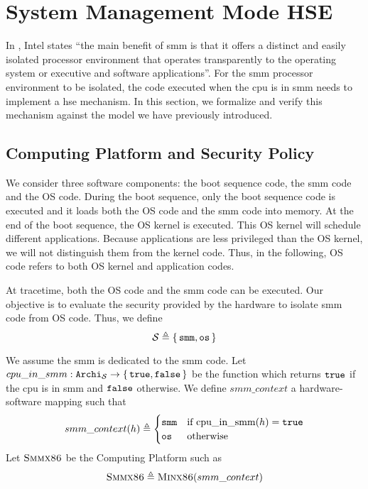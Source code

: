 \section{System Management Mode HSE}
\label{sec:speccert:smm}

In \cite{intel2014manual}, Intel states ``the main benefit of \ac{smm} is that
it offers a distinct and easily isolated processor environment that operates
transparently to the operating system or executive and software applications''.
%
For the \ac{smm} processor environment to be isolated, the code executed when
the \ac{cpu} is in \ac{smm} needs to implement a \ac{hse} mechanism.
%
In this section, we formalize and verify this mechanism against the model we
have previously introduced.

\subsection{Computing Platform and Security Policy}

We consider three software components: the boot sequence code, the \ac{smm} code
and the OS code.
%
During the boot sequence, only the boot sequence code is executed and it loads
both the OS code and the \ac{smm} code into memory.
%
At the end of the boot sequence, the OS kernel is executed.
%
This OS kernel will schedule different applications.
%
Because applications are less privileged than the OS kernel, we will not
distinguish them from the kernel code.
%
Thus, in the following, OS code refers to both OS kernel and application codes.

At tracetime, both the OS code and the \ac{smm} code can be executed.
%
Our objective is to evaluate the security provided by the hardware to isolate
\ac{smm} code from OS code.
%
Thus, we define
%
\[
  \mathcal{S} \triangleq \{\,\mathtt{smm}, \mathtt{os}\,\}
\]

We assume the \ac{smm} is dedicated to the \ac{smm} code.
%
Let
$cpu\_in\_smm : \texttt{Archi}_{\mathcal{S}} \rightarrow \{\,\mathtt{true},
  \mathtt{false}\,\}$ be the function which returns $\mathtt{true}$ if the \ac{cpu} is in
\ac{smm} and $\mathtt{false}$ otherwise.
%
We define $smm\_context$ a hardware-software mapping such that
%
\[
  smm\_context(h) \triangleq
  \begin{cases}
    \mathtt{smm} & \text{if } \mathrm{cpu\_in\_smm}(h) = \mathtt{true} \\
    \mathtt{os} & \text{otherwise}
  \end{cases}
\]
%
Let $\textsc{Smmx86}$ be the Computing Platform such as
%
\[
  \textsc{Smmx86} \triangleq \textsc{Minx86}(smm\_context)
\]

